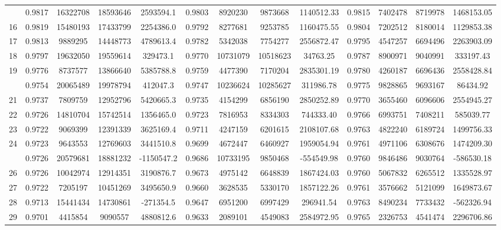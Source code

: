\documentclass[
  12pt,
]{article}
\begin{document}
\begin{longtable}[t]{lcccccccccccc}
\addlinespace
15 & 0.9817 & 16322708 & 18593646 & 2593594.1 & 0.9803 & 8920230 & 9873668 & 1140512.33 & 0.9815 & 7402478 & 8719978 & 1468153.05\\
16 & 0.9819 & 15480193 & 17433799 & 2254386.0 & 0.9792 & 8277681 & 9253785 & 1160475.55 & 0.9804 & 7202512 & 8180014 & 1129853.38\\
17 & 0.9813 & 9889295 & 14448773 & 4789613.4 & 0.9782 & 5342038 & 7754277 & 2556872.47 & 0.9795 & 4547257 & 6694496 & 2263903.09\\
18 & 0.9797 & 19632050 & 19559614 & 329473.1 & 0.9770 & 10731079 & 10518623 & 34763.25 & 0.9787 & 8900971 & 9040991 & 333197.43\\
19 & 0.9776 & 8737577 & 13866640 & 5385788.8 & 0.9759 & 4477390 & 7170204 & 2835301.19 & 0.9780 & 4260187 & 6696436 & 2558428.84\\
\addlinespace
20 & 0.9754 & 20065489 & 19978794 & 412047.3 & 0.9747 & 10236624 & 10285627 & 311986.78 & 0.9775 & 9828865 & 9693167 & 86434.92\\
21 & 0.9737 & 7809759 & 12952796 & 5420665.3 & 0.9735 & 4154299 & 6856190 & 2850252.89 & 0.9770 & 3655460 & 6096606 & 2554945.27\\
22 & 0.9726 & 14810704 & 15742514 & 1356465.0 & 0.9723 & 7816953 & 8334303 & 744333.40 & 0.9766 & 6993751 & 7408211 & 585039.77\\
23 & 0.9722 & 9069399 & 12391339 & 3625169.4 & 0.9711 & 4247159 & 6201615 & 2108107.68 & 0.9763 & 4822240 & 6189724 & 1499756.33\\
24 & 0.9723 & 9643553 & 12769603 & 3441510.8 & 0.9699 & 4672447 & 6460927 & 1959054.94 & 0.9761 & 4971106 & 6308676 & 1474209.30\\
\addlinespace
25 & 0.9726 & 20579681 & 18881232 & -1150547.2 & 0.9686 & 10733195 & 9850468 & -554549.98 & 0.9760 & 9846486 & 9030764 & -586530.18\\
26 & 0.9726 & 10042974 & 12914351 & 3190876.7 & 0.9673 & 4975142 & 6648839 & 1867424.03 & 0.9760 & 5067832 & 6265512 & 1335528.97\\
27 & 0.9722 & 7205197 & 10451269 & 3495650.9 & 0.9660 & 3628535 & 5330170 & 1857122.26 & 0.9761 & 3576662 & 5121099 & 1649873.67\\
28 & 0.9713 & 15441434 & 14730861 & -271354.5 & 0.9647 & 6951200 & 6997429 & 296941.54 & 0.9763 & 8490234 & 7733432 & -562326.94\\
29 & 0.9701 & 4415854 & 9090557 & 4880812.6 & 0.9633 & 2089101 & 4549083 & 2584972.95 & 0.9765 & 2326753 & 4541474 & 2296706.86\\

\end{longtable}
\end{document}
